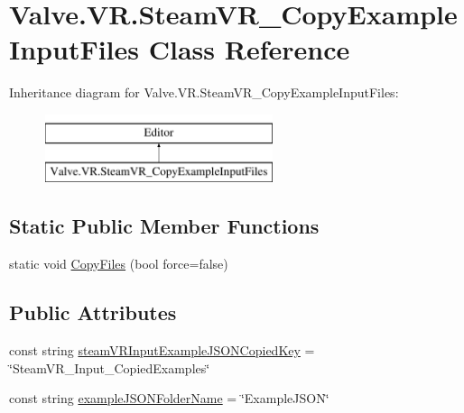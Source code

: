 \hypertarget{class_valve_1_1_v_r_1_1_steam_v_r___copy_example_input_files}{}\section{Valve.\+V\+R.\+Steam\+V\+R\+\_\+\+Copy\+Example\+Input\+Files Class Reference}
\label{class_valve_1_1_v_r_1_1_steam_v_r___copy_example_input_files}
Inheritance diagram for Valve.\+V\+R.\+Steam\+V\+R\+\_\+\+Copy\+Example\+Input\+Files\+:\begin{figure}[H]
\begin{center}
\leavevmode
\includegraphics[height=2.000000cm]{class_valve_1_1_v_r_1_1_steam_v_r___copy_example_input_files}
\end{center}
\end{figure}
\subsection*{Static Public Member Functions}
\begin{DoxyCompactItemize}
\item 
static void \mbox{\hyperlink{class_valve_1_1_v_r_1_1_steam_v_r___copy_example_input_files_aab55e4ea2f323bb32c0977f3c412fc0a}{Copy\+Files}} (bool force=false)
\end{DoxyCompactItemize}
\subsection*{Public Attributes}
\begin{DoxyCompactItemize}
\item 
const string \mbox{\hyperlink{class_valve_1_1_v_r_1_1_steam_v_r___copy_example_input_files_a684bbe28279285b6c21da7f8b7928322}{steam\+V\+R\+Input\+Example\+J\+S\+O\+N\+Copied\+Key}} = \char`\"{}Steam\+V\+R\+\_\+\+Input\+\_\+\+Copied\+Examples\char`\"{}
\item 
const string \mbox{\hyperlink{class_valve_1_1_v_r_1_1_steam_v_r___copy_example_input_files_aa0589f2ba60c395b247ed030d40e045c}{example\+J\+S\+O\+N\+Folder\+Name}} = \char`\"{}Example\+J\+S\+ON\char`\"{}
\end{DoxyCompactItemize}


